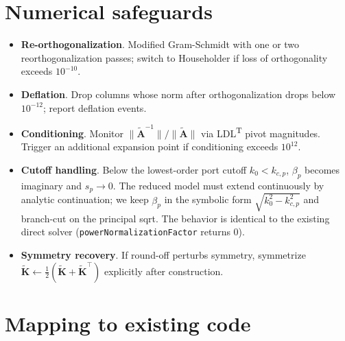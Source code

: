 \documentclass[11pt,a4paper]{article}
\begin{document}
\section{Numerical safeguards}

\begin{itemize}
\item \textbf{Re-orthogonalization}. Modified Gram-Schmidt with one or two
      reorthogonalization passes; switch to Householder if loss of
      orthogonality exceeds $10^{-10}$.
\item \textbf{Deflation}. Drop columns whose norm after orthogonalization
      drops below $10^{-12}$; report deflation events.
\item \textbf{Conditioning}. Monitor $\|\widetilde{\bm A}^{-1}\|/\|\widetilde{\bm A}\|$ via
      LDL\textsuperscript{T} pivot magnitudes. Trigger an additional
      expansion point if conditioning exceeds $10^{12}$.
\item \textbf{Cutoff handling}. Below the lowest-order port cutoff
      $k_0 < k_{c,p}$, $\beta_p$ becomes imaginary and $s_p\to 0$. The
      reduced model must extend continuously by analytic continuation; we
      keep $\beta_p$ in the symbolic form $\sqrt{k_0^2 - k_{c,p}^2}$ and
      branch-cut on the principal sqrt. The behavior is identical to the
      existing direct solver (\texttt{powerNormalizationFactor} returns
      0).
\item \textbf{Symmetry recovery}. If round-off perturbs symmetry,
      symmetrize $\widetilde{\bm K}\!\gets\!\tfrac12(\widetilde{\bm K}+\widetilde{\bm K}^{\!\top})$
      explicitly after construction.
\end{itemize}

\section{Mapping to existing code}
\end{document}
